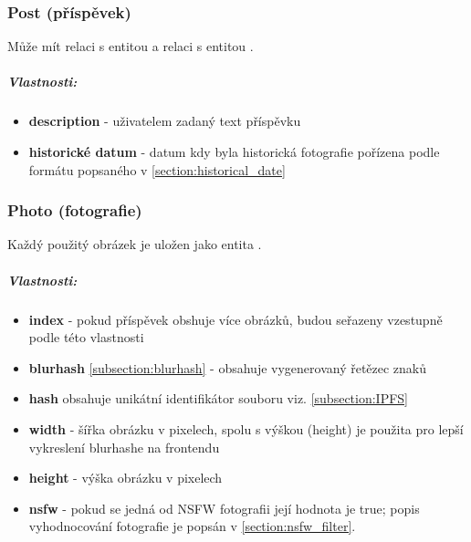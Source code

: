 \documentclass[12pt, a4paper,
 twoside,        %
 openright
]{report}
\newenvironment{propertiesItemize}{
\begin{itemize}{ 
  }}
  {\end{itemize}}
\begin{document}
    	            \subsubsection{Post (příspěvek)}  Může mít relaci  s entitou  a relaci  s entitou .
                          \subparagraph{Vlastnosti:}
 \begin{propertiesItemize}
                                \item \textbf{description} - uživatelem zadaný text příspěvku 
                                \item \textbf{historické datum} - datum kdy byla historická fotografie pořízena podle formátu popsaného v \ref{section:historical_date}
\end{propertiesItemize}
    	            \subsubsection{Photo (fotografie)} Každý použitý obrázek je uložen jako entita .
	                    \subparagraph{Vlastnosti:}  
                           \begin{propertiesItemize}
                                \item \textbf{index} - pokud příspěvek obshuje více obrázků, budou seřazeny vzestupně podle této vlastnosti
                                \item \textbf{blurhash} \ref{subsection:blurhash} - obsahuje vygenerovaný řetězec znaků
                                \item \textbf{hash} obsahuje unikátní identifikátor souboru viz. \ref{subsection:IPFS}
                                \item \textbf{width} - šířka obrázku v pixelech, spolu s výškou (height) je použita pro lepší vykreslení blurhashe na frontendu 
                                \item \textbf{height} - výška obrázku v pixelech
                                \item \textbf{nsfw} - pokud se jedná od NSFW fotografii její hodnota je true; popis vyhodnocování fotografie je popsán v \ref{section:nsfw_filter}.
                        \end{propertiesItemize}
\end{document}
